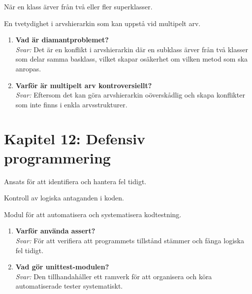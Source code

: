 \documentclass[11pt,a4paper]{article}
\begin{document}
\begin{description}[style=nextline, leftmargin=1cm, labelindent=0.5cm]
    \item[\color{primary}Multipelt arv] När en klass ärver från två eller fler superklasser.
    \item[\color{primary}Diamantproblemet] En tvetydighet i arvshierarkin som kan uppstå vid multipelt arv.
\end{description}

\begin{enumerate}[label=\bfseries\color{primary}Fråga \arabic*:, leftmargin=1.8cm]
    \item \textbf{Vad är diamantproblemet?}
    \\ \textit{Svar:} Det är en konflikt i arvshierarkin där en subklass ärver från två klasser som delar samma basklass, vilket skapar osäkerhet om vilken metod som ska anropas.
    
    \item \textbf{Varför är multipelt arv kontroversiellt?}
    \\ \textit{Svar:} Eftersom det kan göra arvshierarkin oöverskådlig och skapa konflikter som inte finns i enkla arvsstrukturer.
\end{enumerate}

\section{Kapitel 12: Defensiv programmering}

\begin{description}[style=nextline, leftmargin=1cm, labelindent=0.5cm]
    \item[\color{primary}Defensiv programmering] Ansats för att identifiera och hantera fel tidigt.
    \item[\color{primary}Assert] Kontroll av logiska antaganden i koden.
    \item[\color{primary}unittest] Modul för att automatisera och systematisera kodtestning.
\end{description}

\begin{enumerate}[label=\bfseries\color{primary}Fråga \arabic*:, leftmargin=1.8cm]
    \item \textbf{Varför använda assert?}
    \\ \textit{Svar:} För att verifiera att programmets tillstånd stämmer och fånga logiska fel tidigt.
    
    \item \textbf{Vad gör unittest-modulen?}
    \\ \textit{Svar:} Den tillhandahåller ett ramverk för att organisera och köra automatiserade tester systematiskt.
\end{enumerate}
\end{document}
